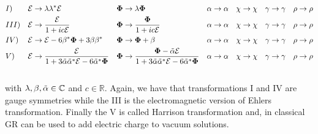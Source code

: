 \begin{align}
  &I) & \mathcal{E} &\rightarrow \lambda\lambda^*\mathcal{E} & \boldsymbol{\Phi} &\rightarrow \lambda\boldsymbol{\Phi} & \alpha &\rightarrow \alpha  & \chi \rightarrow \chi  &&  \gamma \rightarrow \gamma && \rho \rightarrow \rho \notag\\
  &III) &  \mathcal{E} &\rightarrow \frac{\mathcal{E}}{1+ic\mathcal{E}} & \boldsymbol{\Phi} &\rightarrow \frac{\boldsymbol{\Phi}}{1+ic\mathcal{E}} & \alpha &\rightarrow \alpha & \chi \rightarrow \chi  &&  \gamma \rightarrow \gamma && \rho \rightarrow \rho \notag\\
  &IV) & \mathcal{E} &\rightarrow \mathcal{E}-6\beta^*\boldsymbol{\Phi}+3\beta\beta^* & \boldsymbol{\Phi} &\rightarrow \boldsymbol{\Phi} + \beta & \alpha &\rightarrow \alpha & \chi \rightarrow \chi  &&  \gamma \rightarrow \gamma && \rho \rightarrow \rho \notag\\
  &V) &  \mathcal{E} &\rightarrow \frac{\mathcal{E}}{1+3\Tilde{\alpha}\Tilde{\alpha}^*\mathcal{E}-6\Tilde{\alpha}^*\boldsymbol{\Phi}} & \boldsymbol{\Phi} &\rightarrow \frac{\boldsymbol{\Phi}-\Tilde{\alpha}\mathcal{E}}{1+3\Tilde{\alpha}\Tilde{\alpha}^*\mathcal{E}-6\Tilde{\alpha}^*\boldsymbol{\Phi}} & \alpha &\rightarrow \alpha & \chi \rightarrow \chi  &&  \gamma \rightarrow \gamma && \rho \rightarrow \rho \notag\\ 
  \notag
\end{align}
with $\lambda,\beta, \Tilde{\alpha} \in \mathbb{C}$ and $c \in \mathbb{R}$. Again, we have that transformations I and IV are gauge symmetries while the III is the electromagnetic version of Ehlers transformation. 
Finally the V is called Harrison transformation and, in classical GR can be used to add electric charge to vacuum solutions.